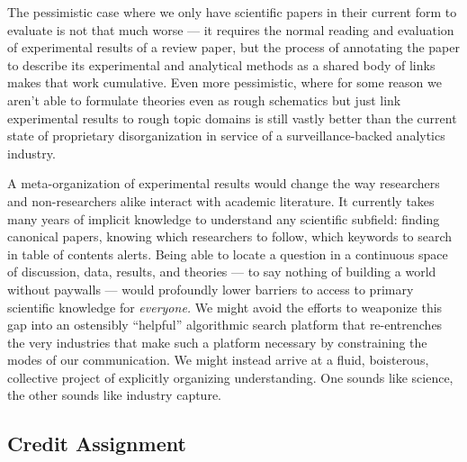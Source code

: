The pessimistic case where we only have scientific papers in their
current form to evaluate is not that much worse --- it requires the
normal reading and evaluation of experimental results of a review paper,
but the process of annotating the paper to describe its experimental and
analytical methods as a shared body of links makes that work cumulative.
Even more pessimistic, where for some reason we aren't able to formulate
theories even as rough schematics but just link experimental results to
rough topic domains is still vastly better than the current state of
proprietary disorganization in service of a surveillance-backed
analytics industry.

A meta-organization of experimental results would change the way
researchers and non-researchers alike interact with academic literature.
It currently takes many years of implicit knowledge to understand any
scientific subfield: finding canonical papers, knowing which researchers
to follow, which keywords to search in table of contents alerts. Being
able to locate a question in a continuous space of discussion, data,
results, and theories --- to say nothing of building a world without
paywalls --- would profoundly lower barriers to access to primary
scientific knowledge for \emph{everyone.} We might avoid the efforts to
weaponize this gap into an ostensibly ``helpful'' algorithmic search
platform that re-entrenches the very industries that make such a
platform necessary by constraining the modes of our communication. We
might instead arrive at a fluid, boisterous, collective project of
explicitly organizing understanding. One sounds like science, the other
sounds like industry capture.

\hypertarget{credit-assignment}{%
\subsection{Credit Assignment}\label{credit-assignment}}

